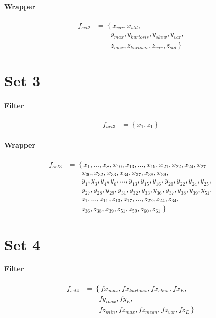 \documentclass[USenglish]{ifimaster}  %
\begin{document}
\paragraph{Wrapper}
\begin{align}
f_{set2} &= \left\{ x_{var}, x_{std}, \right.\nonumber\\
&\qquad \left. {} y_{max}, y_{kurtosis}, y_{skew}, y_{var}, \right.\nonumber\\
&\qquad \left. {} z_{max}, z_{kurtosis}, z_{var}, z_{std} \right\}
\end{align}


\section{Set 3}
\paragraph{Filter}
\begin{align}
f_{set3} &= \left\{ x_{1}, z_{1} \right\}
\end{align}


\paragraph{Wrapper}
\begin{align}
f_{set3} &= \left\{ x_{1},\dotsc,x_{8}, x_{10},x_{13},\dotsc,x_{19},x_{21},x_{22},x_{24},x_{27} \right.\nonumber\\
&\qquad \left. {}  x_{30},x_{32},x_{33},x_{34},x_{37},x_{38},x_{39}, \right.\nonumber\\
&\qquad \left. {}  y_{1},y_{3},y_{4},y_{6},\dotsc,y_{13},y_{15},y_{16},y_{20},y_{22},y_{24},y_{25}, \right.\nonumber\\
&\qquad \left. {} y_{27},y_{28},y_{29},y_{31},y_{32},y_{33},y_{36},y_{37},y_{38},y_{39},y_{51}, \right.\nonumber\\
&\qquad \left. {} z_{1},\dotsc,z_{11},z_{13},z_{17},\dotsc,z_{22},z_{24},z_{34},  \right.\nonumber\\
&\qquad \left. {} z_{36},z_{38},z_{39},z_{51},z_{59},z_{60},z_{61} \right\}
\end{align}



\section{Set 4}
\paragraph{Filter}
\begin{align}
f_{set4} &= \left\{ fx_{max}, fx_{kurtosis}, fx_{skew}, fx_{E}, \right.\nonumber\\
&\qquad \left. {} fy_{max}, fy_{E}, \right.\nonumber\\
&\qquad \left. {} fz_{min}, fz_{max}, fz_{mean}, fz_{var}, fz_{E} \right\}
\end{align}
\end{document}
